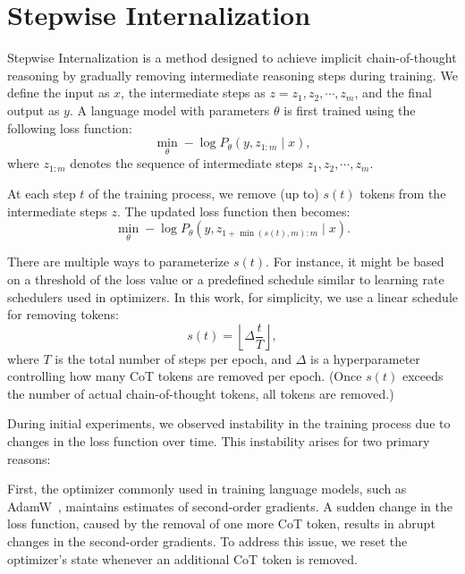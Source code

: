 \documentclass{article}
\begin{document}
\section{\label{sec:method}Stepwise Internalization}
Stepwise Internalization is a method designed to achieve implicit chain-of-thought reasoning by gradually removing intermediate reasoning steps during training. We define the input as $x$, the intermediate steps as $z=z_1,z_2,\cdots,z_m$, and the final output as $y$. A language model with parameters $\theta$ is first trained using the following loss function:
\begin{equation*}
\min_\theta -\log P_\theta (y, z_{1:m} \mid x),
\end{equation*}
where $z_{1:m}$ denotes the sequence of intermediate steps $z_1,z_2,\cdots,z_m$.

At each step $t$ of the training process, we remove (up to) $s(t)$ tokens from the intermediate steps $z$. The updated loss function then becomes:
\begin{equation*}
\min_\theta -\log P_\theta (y, z_{1+\min(s(t), m):m} \mid x).
\end{equation*}

There are multiple ways to parameterize $s(t)$. For instance, it might be based on a threshold of the loss value or a predefined schedule similar to learning rate schedulers used in optimizers. In this work, for simplicity, we use a linear schedule for removing tokens:
\begin{equation*}
s(t) = \left\lfloor \Delta \frac{t}{T} \right\rfloor,
\end{equation*}
where $T$ is the total number of steps per epoch, and $\Delta$ is a hyperparameter controlling how many CoT tokens are removed per epoch. (Once $s(t)$ exceeds the number of actual chain-of-thought tokens, all tokens are removed.)

During initial experiments, we observed instability in the training process due to changes in the loss function over time. This instability arises for two primary reasons:

First, the optimizer commonly used in training language models, such as AdamW~\citep{kingma2017adam,loshchilov2018decoupled}, maintains estimates of second-order gradients. A sudden change in the loss function, caused by the removal of one more CoT token, results in abrupt changes in the second-order gradients. To address this issue, we reset the optimizer's state whenever an additional CoT token is removed.
\end{document}
